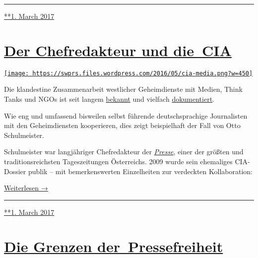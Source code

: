 \begin{center}\rule{0.5\linewidth}{\linethickness}\end{center}

\href{https://swprs.org/2017/03/01/leserkommentare/}{**1. March 2017}

\hypertarget{der-chefredakteur-und-die-cia}{%
\section{\texorpdfstring{\href{https://swprs.org/2017/03/01/chefredakteur-cia/}{Der
Chefredakteur und
die~CIA}}{Der Chefredakteur und die~CIA}}\label{der-chefredakteur-und-die-cia}}

\href{https://swprs.org/2017/03/01/chefredakteur-cia/}{\texttt{[image: https://swprs.files.wordpress.com/2016/05/cia-media.png?w=450]}}

Die klandestine Zu­sam­men­arbeit west­licher Geheim­dienste mit Medien,
Think Tanks und NGOs ist seit langem
\href{http://carlbernstein.com/magazine_cia_and_media.php}{bekannt} und
vielfach
\href{http://www.amazon.de/Geheimdienst-Politik-Medien-Meinungsmache-Zeitgeschichte/dp/3897068796}{doku­men­tiert}.

Wie eng und um­fas­send bisweilen selbst füh­ren­de deutsch­spra­chige
Jour­na­listen mit den Ge­heim­diens­ten kooperieren, dies zeigt
bei­spiel­haft der Fall von Otto Schul­meister.

Schul­meister war lang­jäh­riger Chef­re­dak­teur der
\href{https://de.wikipedia.org/wiki/Die_Presse}{\emph{Presse}}, einer
der größ­ten und tra­di­tions­reich­sten Tages­­zeitungen Öster­reichs.
2009 wurde sein ehemaliges CIA-Dossier publik -- mit bemerkenswerten
Einzel­heiten zur ver­deckten Kol­la­bo­ration:

\href{https://swprs.org/der-chefredakteur-und-die-cia\#weiterlesen}{Weiterlesen
→}

\begin{center}\rule{0.5\linewidth}{\linethickness}\end{center}

\href{https://swprs.org/2017/03/01/chefredakteur-cia/}{**1. March 2017}

\hypertarget{die-grenzen-der-pressefreiheit}{%
\section{\texorpdfstring{\href{https://swprs.org/2017/03/01/die-grenzen-der-pressefreiheit/}{Die
Grenzen
der~Pressefreiheit}}{Die Grenzen der~Pressefreiheit}}\label{die-grenzen-der-pressefreiheit}}

